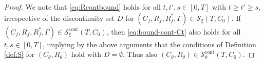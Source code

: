 \documentclass[10pt,a4paper]{amsart}
\def\Cf{C_f}
\def\Ct{C_\theta}
\def\Rf{R_f}
\def\Rt{R_\theta}
\def\cS{\mathcal{S}}
\begin{document}
\begin{proof}
We note that \eqref{eq:Rcontbound} holds for all $t,t',s \in [0,T]$ with
$t \geq t' \geq s$, irrespective of the discontinuity set
$D$ for $(\Cf,\Rf,\Rf^*,\Gamma) \in \cS_\xi(T,C_0)$.
If $(\Cf,\Rf,\Rf^*,\Gamma)\in \mathcal{S}^{\mathrm{cont}}_\xi(T,C_0)$, then
\eqref{eq:bound-cont-Ct} also holds for all $t,s \in [0,T]$, implying by the
above arguments that the conditions of Definition \ref{def:S} for
$(C_\theta,R_\theta)$ hold with $D=\emptyset$.
Thus also $(\Ct,\Rt) \in {\mathcal{S}}_\theta^\mathrm{cont}(T,C_0)$.
\end{proof}
\end{document}
